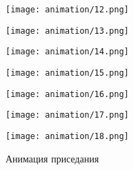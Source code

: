 \begin{figure}
  \begin{minipage}{0.327\textwidth}
    \centering
    \texttt{[image: animation/12.png]}
  \end{minipage}
  \vfill
  \hfill
  \begin{minipage}{0.327\textwidth}
    \centering
    \texttt{[image: animation/13.png]}
  \end{minipage}
  \begin{minipage}{0.327\textwidth}
    \centering
    \texttt{[image: animation/14.png]}
  \end{minipage}
  \begin{minipage}{0.327\textwidth}
    \centering
    \texttt{[image: animation/15.png]}
  \end{minipage}
  \vfill
  \hfill
  \begin{minipage}{0.327\textwidth}
    \centering
    \texttt{[image: animation/16.png]}
  \end{minipage}
  \begin{minipage}{0.327\textwidth}
    \centering
    \texttt{[image: animation/17.png]}
  \end{minipage}
  \begin{minipage}{0.327\textwidth}
    \centering
    \texttt{[image: animation/18.png]}
  \end{minipage}
  \caption{Анимация приседания}
\end{figure}

